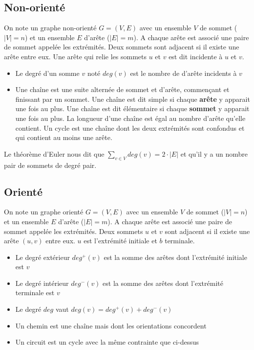 \documentclass[11pt,a4paper]{report}
\begin{document}
\subsection{Non-orienté}
On note un graphe non-orienté $G=(V,E)$ avec un ensemble $V$ de sommet ($|V|=n$) et un ensemble $E$ d'arête ($|E|=m$). A chaque arête est associé une paire de sommet appelée les extrémités. Deux sommets sont adjacent si il existe une arête entre eux. Une arête qui relie les sommets $u$ et $v$ est dit incidente à $u$ et $v$.

\begin{itemize}
    \item Le degré d'un somme $v$ noté $deg(v)$ est le nombre de d'arête incidents à $v$
    \item Une chaîne est une suite alternée de sommet et d'arête, commençant et finissant par un sommet. Une chaîne est dit simple si chaque \textbf{arête} y apparait une fois au plus. Une chaîne est dit élémentaire si chaque \textbf{sommet} y apparait une fois au plus. La longueur d'une chaîne est égal au nombre d'arête qu'elle contient. Un cycle est une chaîne dont les deux extrémités sont confondus et qui contient au moins une arête.
\end{itemize}

Le théorème d'Euler nous dit que $\sum_{v\in V} deg(v) = 2\cdot |E|$ et qu'il y a un nombre pair de sommets de degré pair.

\subsection{Orienté}
On note un graphe orienté $G=(V,E)$ avec un ensemble $V$ de sommet ($|V|=n$) et un ensemble $E$ d'arête ($|E|=m$). A chaque arête est associé une paire de sommet appelée les extrémités. Deux sommets $u$ et $v$ sont adjacent si il existe une arête $(u,v)$ entre eux. $u$ est l'extrémité initiale et $b$ terminale.

\begin{itemize}
    \item Le degré extérieur $deg^+(v)$ est la somme des arêtes dont l'extrémité initiale est $v$
    \item Le degré intérieur $deg^-(v)$ est la somme des arêtes dont l'extrémité terminale est $v$
    \item Le degré $deg$ vaut $deg(v)=deg^+(v)+deg^-(v)$
    \item Un chemin est une chaîne mais dont les orientations concordent
    \item Un circuit est un cycle avec la même contrainte que ci-dessus
\end{itemize}
\end{document}
